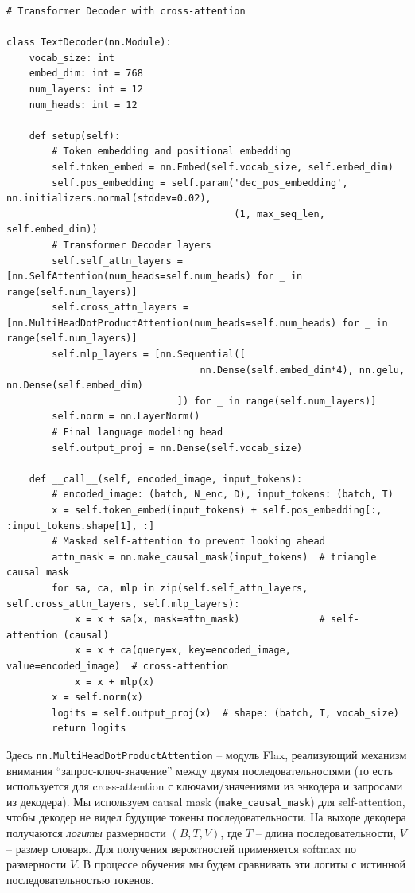 \documentclass{article}
\begin{document}
\begin{lstlisting}
# Transformer Decoder with cross-attention

class TextDecoder(nn.Module):
    vocab_size: int
    embed_dim: int = 768
    num_layers: int = 12
    num_heads: int = 12

    def setup(self):
        # Token embedding and positional embedding
        self.token_embed = nn.Embed(self.vocab_size, self.embed_dim)
        self.pos_embedding = self.param('dec_pos_embedding', nn.initializers.normal(stddev=0.02),
                                        (1, max_seq_len, self.embed_dim))
        # Transformer Decoder layers
        self.self_attn_layers = [nn.SelfAttention(num_heads=self.num_heads) for _ in range(self.num_layers)]
        self.cross_attn_layers = [nn.MultiHeadDotProductAttention(num_heads=self.num_heads) for _ in range(self.num_layers)]
        self.mlp_layers = [nn.Sequential([
                                  nn.Dense(self.embed_dim*4), nn.gelu, nn.Dense(self.embed_dim)
                              ]) for _ in range(self.num_layers)]
        self.norm = nn.LayerNorm()
        # Final language modeling head
        self.output_proj = nn.Dense(self.vocab_size)

    def __call__(self, encoded_image, input_tokens):
        # encoded_image: (batch, N_enc, D), input_tokens: (batch, T)
        x = self.token_embed(input_tokens) + self.pos_embedding[:, :input_tokens.shape[1], :]
        # Masked self-attention to prevent looking ahead
        attn_mask = nn.make_causal_mask(input_tokens)  # triangle causal mask
        for sa, ca, mlp in zip(self.self_attn_layers, self.cross_attn_layers, self.mlp_layers):
            x = x + sa(x, mask=attn_mask)              # self-attention (causal)
            x = x + ca(query=x, key=encoded_image, value=encoded_image)  # cross-attention
            x = x + mlp(x) 
        x = self.norm(x)
        logits = self.output_proj(x)  # shape: (batch, T, vocab_size)
        return logits
\end{lstlisting}

Здесь \texttt{nn.MultiHeadDotProductAttention} – модуль Flax, реализующий механизм внимания “запрос-ключ-значение” между двумя последовательностями (то есть используется для cross-attention с ключами/значениями из энкодера и запросами из декодера). Мы используем causal mask (\texttt{make_causal_mask}) для self-attention, чтобы декодер не видел будущие токены последовательности. На выходе декодера получаются \textit{логиты} размерности $(B, T, V)$, где $T$ – длина последовательности, $V$ – размер словаря. Для получения вероятностей применяется softmax по размерности $V$. В процессе обучения мы будем сравнивать эти логиты с истинной последовательностью токенов.
\end{document}
